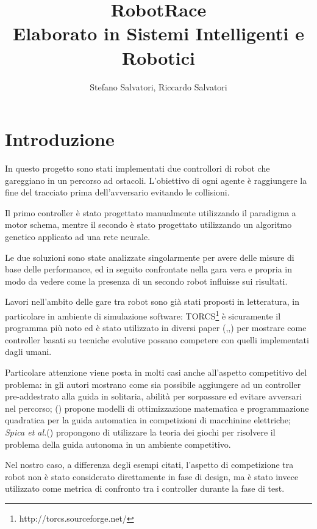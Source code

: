 \documentclass[UTF8]{article}
\title{%
    RobotRace 
    \\
    \large Elaborato in Sistemi Intelligenti e Robotici}
\author{Stefano Salvatori, Riccardo Salvatori}
\begin{document}
\maketitle

\clearpage

\tableofcontents{}

\clearpage


\section{Introduzione}
In questo progetto sono stati implementati due controllori di robot che gareggiano in un percorso ad ostacoli. L'obiettivo di ogni agente è raggiungere la fine del tracciato prima dell'avversario evitando le collisioni.

Il primo controller è stato progettato manualmente  utilizzando il paradigma a motor schema, mentre il secondo è stato progettato utilizzando un algoritmo genetico applicato ad una rete neurale.

Le due soluzioni sono state analizzate singolarmente per avere delle misure di base delle performance, ed in seguito confrontate nella gara vera e propria in modo da vedere come la presenza di un secondo robot influisse sui risultati.

Lavori nell'ambito delle gare tra robot sono già stati proposti in letteratura, in particolare in ambiente di simulazione software: TORCS\footnote{http://torcs.sourceforge.net/} è sicuramente il programma più noto ed è stato utilizzato in diversi paper  (\cite{neuroev_torcs},\cite{ga_torcs},\cite{fuzzy_ev}) per mostrare come controller basati su tecniche evolutive possano competere con quelli implementati dagli umani.

Particolare attenzione viene posta in molti casi anche all'aspetto competitivo del problema: in \cite{neuroev_torcs} gli autori mostrano come sia possibile aggiungere ad un controller pre-addestrato alla guida in solitaria, abilità per sorpassare ed evitare avversari nel percorso; (\cite{Liniger_2014}) propone modelli di ottimizzazione matematica e programmazione quadratica per la guida automatica in competizioni di macchinine elettriche; \textit{Spica et al.}(\cite{gt_competition}) propongono di utilizzare la teoria dei giochi per risolvere il problema della guida autonoma in un ambiente competitivo.

Nel nostro caso, a differenza degli esempi citati, l'aspetto di competizione tra robot non è stato considerato direttamente in fase di design, ma è stato invece utilizzato come metrica di confronto tra i controller durante la fase di test. 
\end{document}
